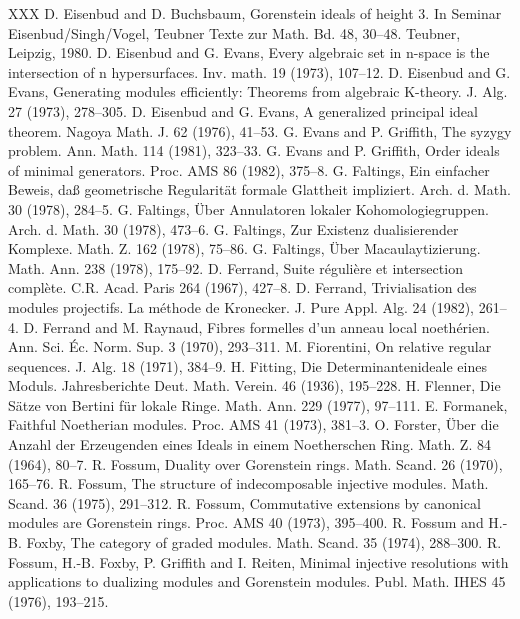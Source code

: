 \begin{thebibliography}{XXX}
 D. Eisenbud and D. Buchsbaum, Gorenstein ideals of height 3. In Seminar Eisenbud/Singh/Vogel, Teubner Texte zur Math. Bd. 48, 30--48. Teubner, Leipzig, 1980.
 D. Eisenbud and G. Evans, Every algebraic set in n-space is the intersection of n hypersurfaces. Inv. math. 19 (1973), 107--12.
 D. Eisenbud and G. Evans, Generating modules efficiently: Theorems from algebraic K-theory. J. Alg. 27 (1973), 278--305.
 D. Eisenbud and G. Evans, A generalized principal ideal theorem. Nagoya Math. J. 62 (1976), 41--53.
 G. Evans and P. Griffith, The syzygy problem. Ann. Math. 114 (1981), 323--33.
 G. Evans and P. Griffith, Order ideals of minimal generators. Proc. AMS 86 (1982), 375--8.
 G. Faltings, Ein einfacher Beweis, da\ss{} geometrische Regularit\"at formale Glattheit impliziert. Arch. d. Math. 30 (1978), 284--5.
 G. Faltings, \"Uber Annulatoren lokaler Kohomologiegruppen. Arch. d. Math. 30 (1978), 473--6.
 G. Faltings, Zur Existenz dualisierender Komplexe. Math. Z. 162 (1978), 75--86.
 G. Faltings, \"Uber Macaulaytizierung. Math. Ann. 238 (1978), 175--92.
 D. Ferrand, Suite r\'eguli\`ere et intersection compl\`ete. C.R. Acad. Paris 264 (1967), 427--8.
 D. Ferrand, Trivialisation des modules projectifs. La m\'ethode de Kronecker. J. Pure Appl. Alg. 24 (1982), 261--4.
 D. Ferrand and M. Raynaud, Fibres formelles d'un anneau local noeth\'erien. Ann. Sci. \'Ec. Norm. Sup. 3 (1970), 293--311.
 M. Fiorentini, On relative regular sequences. J. Alg. 18 (1971), 384--9.
 H. Fitting, Die Determinantenideale eines Moduls. Jahresberichte Deut. Math. Verein. 46 (1936), 195--228.
 H. Flenner, Die S\"atze von Bertini f\"ur lokale Ringe. Math. Ann. 229 (1977), 97--111.
 E. Formanek, Faithful Noetherian modules. Proc. AMS 41 (1973), 381--3.
 O. Forster, \"Uber die Anzahl der Erzeugenden eines Ideals in einem Noetherschen Ring. Math. Z. 84 (1964), 80--7.
 R. Fossum, Duality over Gorenstein rings. Math. Scand. 26 (1970), 165--76.
 R. Fossum, The structure of indecomposable injective modules. Math. Scand. 36 (1975), 291--312.
 R. Fossum, Commutative extensions by canonical modules are Gorenstein rings. Proc. AMS 40 (1973), 395--400.
 R. Fossum and H.-B. Foxby, The category of graded modules. Math. Scand. 35 (1974), 288--300.
 R. Fossum, H.-B. Foxby, P. Griffith and I. Reiten, Minimal injective resolutions with applications to dualizing modules and Gorenstein modules. Publ. Math. IHES 45 (1976), 193--215.

\end{thebibliography}
